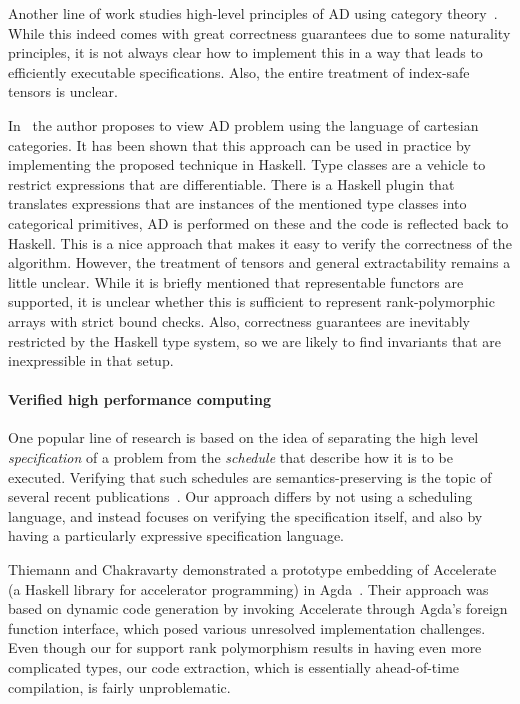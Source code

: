 Another line of work studies high-level principles of AD using
category theory~\cite{ad-theor1, ad-theor2, ad-theor3}.
While this indeed comes with great correctness guarantees due to
some naturality principles, it is not always clear how to implement
this in a way that leads to efficiently executable specifications.  Also, the
entire treatment of index-safe tensors is unclear.

In~\cite{ad-elliott} the author proposes to view AD problem using
the language of cartesian categories.  It has been shown that
this approach can be used in practice by implementing the proposed
technique in Haskell.  Type classes are a vehicle to restrict expressions
that are differentiable.  There is a Haskell plugin that translates
expressions that are instances of the mentioned type classes into
categorical primitives, AD is performed on these and the code is reflected
back to Haskell.  This is a nice approach that makes it easy
to verify the correctness of the algorithm.  However, the treatment
of tensors and general extractability remains a little unclear.
While it is briefly mentioned that representable functors
are supported, it is unclear whether this is sufficient to
represent rank-polymorphic arrays with strict bound checks.
Also, correctness guarantees are inevitably restricted by the
Haskell type system, so we are likely to find invariants that
are inexpressible in that setup.

\paragraph{Verified high performance computing}

One popular line of research is based on the idea of separating the
high level \emph{specification} of a problem from the \emph{schedule}
that describe how it is to be executed. Verifying that such schedules
are semantics-preserving is the topic of several recent
publications~\cite{10.1145/3527328,10.1145/3498717}. Our approach
differs by not using a scheduling language, and instead focuses on
verifying the specification itself, and also by having a particularly
expressive specification language.

Thiemann and Chakravarty demonstrated a prototype embedding of
Accelerate~\cite{10.1145/1926354.1926358} (a Haskell library for
accelerator programming) in Agda~\cite{thiemann2013agda}. Their
approach was based on dynamic code generation by invoking Accelerate
through Agda's foreign function interface, which posed various
unresolved implementation challenges. Even though our for support rank
polymorphism results in having even more complicated types, our code
extraction, which is essentially ahead-of-time compilation, is fairly
unproblematic.

